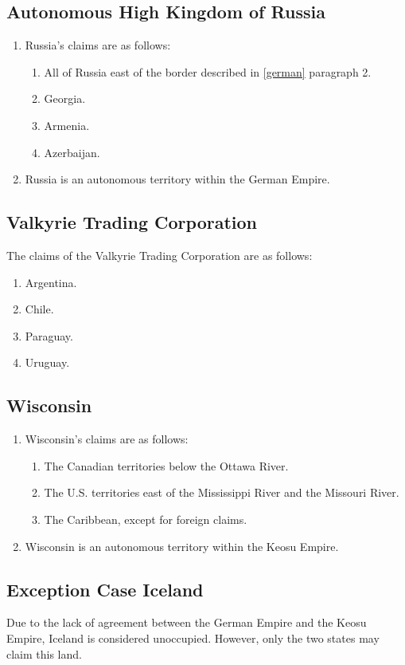 \documentclass{article}
\begin{document}
\subsection{Autonomous High Kingdom of Russia}
\begin{enumerate}[(1)]
    \item Russia's claims are as follows:
    \begin{enumerate}[1.]
        \item All of Russia east of the border described in \ref{german} paragraph 2.
        \item Georgia.
        \item Armenia.
        \item Azerbaijan.
    \end{enumerate}
    \item Russia is an autonomous territory within the German Empire.
\end{enumerate}

\subsection{Valkyrie Trading Corporation}
The claims of the Valkyrie Trading Corporation are as follows:
\begin{enumerate}
    \item Argentina.
    \item Chile.
    \item Paraguay.
    \item Uruguay.
\end{enumerate}

\subsection{Wisconsin}
\begin{enumerate}[(1)]
    \item Wisconsin's claims are as follows:
    \begin{enumerate}[1.]
        \item The Canadian territories below the Ottawa River.
        \item The U.S. territories east of the Mississippi River and the Missouri River.
        \item The Caribbean, except for foreign claims.
    \end{enumerate}
    \item Wisconsin is an autonomous territory within the Keosu Empire.
\end{enumerate}

\subsection{Exception Case Iceland}
Due to the lack of agreement between the German Empire and the Keosu Empire, Iceland is considered unoccupied. However, only the two states may claim this land.
\end{document}
